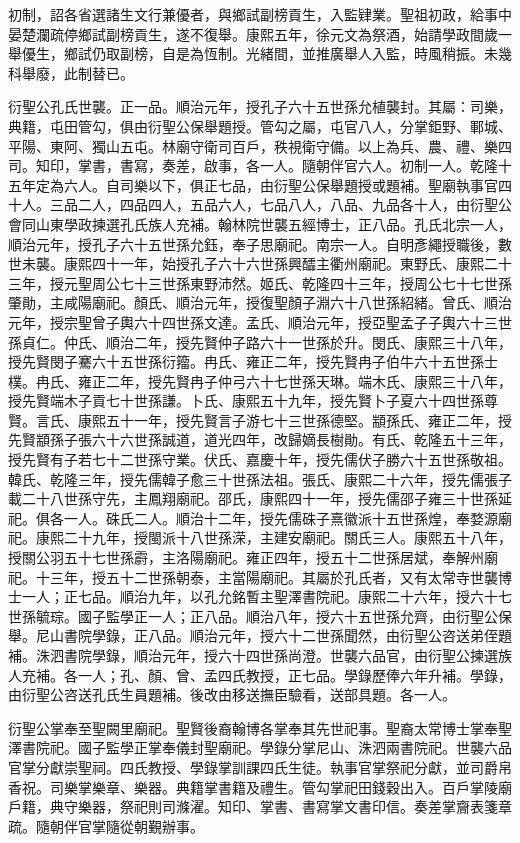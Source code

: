 \begin{pinyinscope}
初制，詔各省選諸生文行兼優者，與鄉試副榜貢生，入監肄業。聖祖初政，給事中晏楚瀾疏停鄉試副榜貢生，遂不復舉。康熙五年，徐元文為祭酒，始請學政間歲一舉優生，鄉試仍取副榜，自是為恆制。光緒間，並推廣舉人入監，時風稍振。未幾科舉廢，此制替已。

衍聖公孔氏世襲。正一品。順治元年，授孔子六十五世孫允植襲封。其屬：司樂，典籍，屯田管勾，俱由衍聖公保舉題授。管勾之屬，屯官八人，分掌鉅野、鄆城、平陽、東阿、獨山五屯。林廟守衛司百戶，秩視衛守備。以上為兵、農、禮、樂四司。知印，掌書，書寫，奏差，啟事，各一人。隨朝伴官六人。初制一人。乾隆十五年定為六人。自司樂以下，俱正七品，由衍聖公保舉題授或題補。聖廟執事官四十人。三品二人，四品四人，五品六人，七品八人，八品、九品各十人，由衍聖公會同山東學政揀選孔氏族人充補。翰林院世襲五經博士，正八品。孔氏北宗一人，順治元年，授孔子六十五世孫允鈺，奉子思廟祀。南宗一人。自明彥繩授職後，數世未襲。康熙四十一年，始授孔子六十六世孫興醽主衢州廟祀。東野氏、康熙二十三年，授元聖周公七十三世孫東野沛然。姬氏、乾隆四十三年，授周公七十七世孫肇勛，主咸陽廟祀。顏氏、順治元年，授復聖顏子淵六十八世孫紹緒。曾氏、順治元年，授宗聖曾子輿六十四世孫文達。孟氏、順治元年，授亞聖孟子子輿六十三世孫貞仁。仲氏、順治二年，授先賢仲子路六十一世孫於升。閔氏、康熙三十八年，授先賢閔子騫六十五世孫衍籀。冉氏、雍正二年，授先賢冉子伯牛六十五世孫士樸。冉氏、雍正二年，授先賢冉子仲弓六十七世孫天琳。端木氏、康熙三十八年，授先賢端木子貢七十世孫謙。卜氏、康熙五十九年，授先賢卜子夏六十四世孫尊賢。言氏、康熙五十一年，授先賢言子游七十三世孫德堅。顓孫氏、雍正二年，授先賢顓孫子張六十六世孫誠道，道光四年，改歸嫡長樹勛。有氏、乾隆五十三年，授先賢有子若七十二世孫守業。伏氏、嘉慶十年，授先儒伏子勝六十五世孫敬祖。韓氏、乾隆三年，授先儒韓子愈三十世孫法祖。張氏、康熙二十六年，授先儒張子載二十八世孫守先，主鳳翔廟祀。邵氏，康熙四十一年，授先儒邵子雍三十世孫延祀。俱各一人。硃氏二人。順治十二年，授先儒硃子熹徽派十五世孫煌，奉婺源廟祀。康熙二十九年，授閩派十八世孫溁，主建安廟祀。關氏三人。康熙五十八年，授關公羽五十七世孫霨，主洛陽廟祀。雍正四年，授五十二世孫居斌，奉解州廟祀。十三年，授五十二世孫朝泰，主當陽廟祀。其屬於孔氏者，又有太常寺世襲博士一人；正七品。順治九年，以孔允銘暫主聖澤書院祀。康熙二十六年，授六十七世孫毓琮。國子監學正一人；正八品。順治八年，授六十五世孫允齊，由衍聖公保舉。尼山書院學錄，正八品。順治元年，授六十二世孫聞然，由衍聖公咨送弟侄題補。洙泗書院學錄，順治元年，授六十四世孫尚澄。世襲六品官，由衍聖公揀選族人充補。各一人；孔、顏、曾、孟四氏教授，正七品。學錄歷俸六年升補。學錄，由衍聖公咨送孔氏生員題補。後改由移送撫臣驗看，送部具題。各一人。

衍聖公掌奉至聖闕里廟祀。聖賢後裔翰博各掌奉其先世祀事。聖裔太常博士掌奉聖澤書院祀。國子監學正掌奉儀封聖廟祀。學錄分掌尼山、洙泗兩書院祀。世襲六品官掌分獻崇聖祠。四氏教授、學錄掌訓課四氏生徒。執事官掌祭祀分獻，並司爵帛香祝。司樂掌樂章、樂器。典籍掌書籍及禮生。管勾掌祀田錢穀出入。百戶掌陵廟戶籍，典守樂器，祭祀則司滌濯。知印、掌書、書寫掌文書印信。奏差掌齎表箋章疏。隨朝伴官掌隨從朝覲辦事。


\end{pinyinscope}
